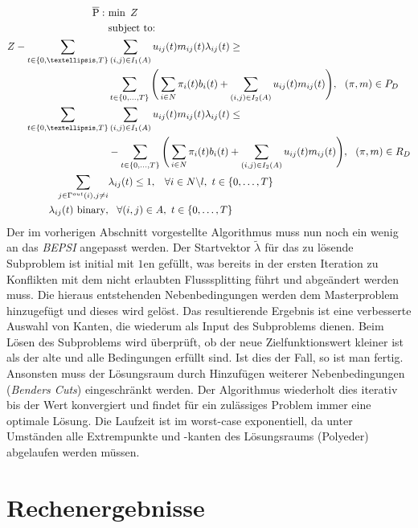 \documentclass[a4paper, 11pt]{scrreprt}
\begin{document}
\begin{align}
  \overline{\text{P}}:\,\,&\text{min}\,\,\, Z\label{eq:z}\\
  &\text{subject to:}  \notag\\
  Z - \sum_{t \in \{0,…,T\}}&\sum_{(i,j) \in I_1(A)} u_{ij}(t)m_{ij}(t)\lambda_{ij}(t) \geq\notag\\ &\sum_{t\in\{0,\dots,T\}} \Bigg(\sum_{i \in N}\pi_i(t)b_i(t) + \sum_{(i,j)\in I_2(A)}u_{ij}(t)m_{ij}(t)\Bigg), \,\,\,\, (\pi,m) \in P_D\label{eq:cut_opti}\\
  \sum_{t \in \{0,…,T\}}&\sum_{(i,j) \in I_1(A)} u_{ij}(t)m_{ij}(t)\lambda_{ij}(t) \leq\notag\\  & - \sum_{t\in\{0,\dots,T\}} \Bigg(\sum_{i \in N}\pi_i(t)b_i(t) + \sum_{(i,j)\in I_2(A)}u_{ij}(t)m_{ij}(t)\Bigg), \,\,\,\, (\pi,m) \in R_D\label{eq:cut_feas}\\
  \sum_{j \in \Gamma^{out}(i), j\neq i} &\lambda_{ij}(t) \leq 1, \,\,\,\,\, \forall i \in N \backslash l,\,\, t \in \{0,\dots,T\}\\
  \lambda_{ij}(t) \,\, \text{binary}, & \,\,\,\,\, \forall (i,j) \in A, \,\, t \in \{0,\dots,T\}
\end{align}
Der im vorherigen Abschnitt vorgestellte Algorithmus muss nun noch ein wenig an das \textit{BEPSI}
angepasst werden. Der Startvektor $\tilde{\lambda}$ für das zu lösende Subproblem ist initial mit $1$en
gefüllt, was bereits
in der ersten Iteration zu Konflikten mit dem nicht erlaubten Flusssplitting führt und abgeändert werden muss.
Die hieraus entstehenden Nebenbedingungen werden dem Masterproblem hinzugefügt und dieses wird gelöst.
Das resultierende Ergebnis ist eine verbesserte Auswahl von Kanten, die wiederum als Input
des Subproblems dienen.
Beim Lösen des Subproblems wird überprüft, ob der neue Zielfunktionswert kleiner ist als der alte und
alle Bedingungen erfüllt sind. Ist dies der Fall, so ist man fertig.
Ansonsten muss der Lösungsraum durch Hinzufügen weiterer Nebenbedingungen (\textit{Benders Cuts}) eingeschränkt werden.
Der Algorithmus wiederholt dies iterativ bis der Wert konvergiert und findet für ein zulässiges Problem
immer eine optimale Lösung. Die Laufzeit ist im worst-case exponentiell, da unter Umständen alle
Extrempunkte und -kanten des Lösungsraums (Polyeder) abgelaufen werden müssen.




\chapter{Rechenergebnisse}
\label{sec:beispiel}
\end{document}
